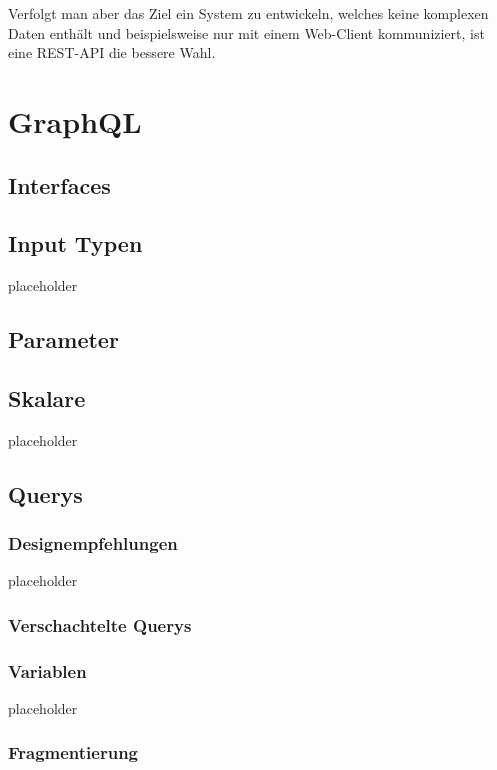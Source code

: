 \documentclass[bachelor, german ]{hgbthesis}
\begin{document}
Verfolgt man aber das Ziel ein System zu entwickeln, welches keine komplexen Daten enthält und beispielsweise nur mit einem Web-Client kommuniziert, ist eine REST-API die bessere Wahl.

\chapter{GraphQL}

\section{Interfaces}

\section{Input Typen}

placeholder
\pagebreak

\section{Parameter}

\section{Skalare}

placeholder
\pagebreak

\section{Querys}

\subsection{Designempfehlungen}

placeholder
\pagebreak

\subsection{Verschachtelte Querys}

\subsection{Variablen}

placeholder
\pagebreak

\subsection{Fragmentierung}
\end{document}
